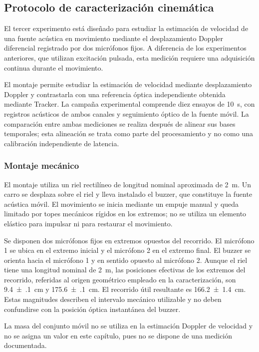 \subsection{Protocolo de caracterización cinemática}
\label{sec:exp03_cinematica}

El tercer experimento está diseñado para estudiar
la estimación de velocidad de una fuente acústica
en movimiento mediante el desplazamiento Doppler
diferencial registrado por dos micrófonos fijos.
A diferencia de los experimentos anteriores, que
utilizan excitación pulsada, esta medición requiere
una adquisición continua durante el movimiento.

El montaje permite estudiar la estimación de velocidad
mediante desplazamiento Doppler y contrastarla con una
referencia óptica independiente obtenida mediante Tracker.
La campaña experimental comprende diez ensayos de
\SI{10}{\second}, con registros acústicos de ambos canales
y seguimiento óptico de la fuente móvil. La comparación
entre ambas mediciones se realiza después de alinear sus
bases temporales; esta alineación se trata como parte del
procesamiento y no como una calibración independiente de
latencia.

\subsubsection{Montaje mecánico}

El montaje utiliza un riel rectilíneo de longitud nominal
aproximada de \SI{2}{\metre}. Un carro se desplaza sobre
el riel y lleva instalado el buzzer, que constituye la
fuente acústica móvil. El movimiento se inicia mediante
un empuje manual y queda limitado por topes mecánicos
rígidos en los extremos; no se utiliza un elemento
elástico para impulsar ni para restaurar el movimiento.

Se disponen dos micrófonos fijos en extremos opuestos
del recorrido. El micrófono 1 se ubica en el extremo
inicial y el micrófono 2 en el extremo final. El buzzer
se orienta hacia el micrófono 1 y en sentido opuesto
al micrófono 2. Aunque el riel tiene una longitud
nominal de \SI{2}{\metre}, las posiciones efectivas
de los extremos del recorrido, referidas al origen
geométrico empleado en la caracterización, son
\SI{9.4(1)}{\centi\metre} y
\SI{175.6(1)}{\centi\metre}. El recorrido útil
resultante es \SI{166.2(14)}{\centi\metre}.
Estas magnitudes describen el intervalo mecánico
utilizable y no deben confundirse con la posición
óptica instantánea del buzzer.

La masa del conjunto móvil no se utiliza en la
estimación Doppler de velocidad y no se asigna un
valor en este capítulo, pues no se dispone de una
medición documentada.

